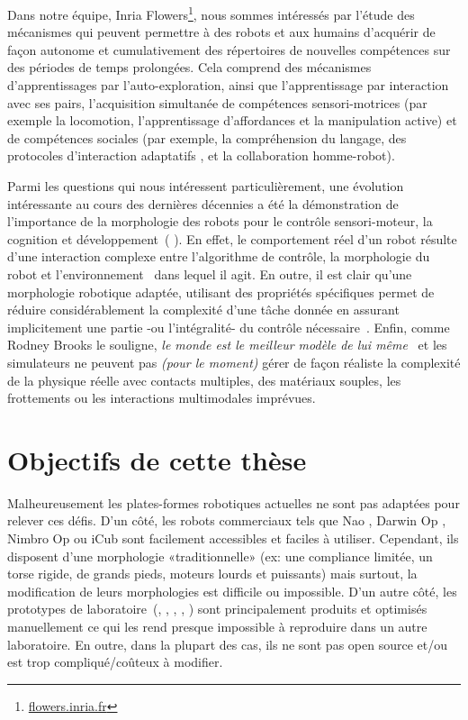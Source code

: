 Dans notre équipe, Inria Flowers\footnote{\url{flowers.inria.fr}}, nous sommes intéressés par l'étude des mécanismes qui peuvent permettre à des robots et aux humains d'acquérir de façon autonome et cumulativement des répertoires de nouvelles compétences sur des périodes de temps prolongées. Cela comprend des mécanismes d'apprentissages par l'auto-exploration, ainsi que l'apprentissage par interaction avec ses pairs, l'acquisition simultanée de compétences sensori-motrices (par exemple la locomotion, l'apprentissage d'affordances et la manipulation active) et de compétences sociales (par exemple, la compréhension du langage, des protocoles d'interaction adaptatifs , et la collaboration homme-robot).

Parmi les questions qui nous intéressent particulièrement, une évolution intéressante au cours des dernières décennies a été la démonstration de l'importance de la morphologie des robots pour le contrôle sensori-moteur, la cognition et développement~(\cite{kaplan2008corps} \cite{steels1995artificial} \cite{Pfeifer06}). En effet, le comportement réel d'un robot résulte d'une interaction complexe entre l'algorithme de contrôle, la morphologie du robot et l'environnement~\parencite{Steels1991emergence} dans lequel il agit. En outre, il est clair qu’une morphologie  robotique adaptée, utilisant des propriétés spécifiques permet de réduire considérablement la complexité d'une tâche donnée en assurant implicitement une partie -ou l’intégralité- du contrôle nécessaire~\parencite{pfeifer2005morphological}.
Enfin, comme Rodney Brooks le souligne, \emph{le monde est le meilleur modèle de lui même}~\parencite{brooks1991intelligence} et les simulateurs ne peuvent pas \emph{(pour le moment)} gérer de façon réaliste la complexité de la physique réelle avec contacts multiples, des matériaux souples, les frottements ou les interactions multimodales imprévues.


\section*{Objectifs de cette thèse} %

Malheureusement les plates-formes robotiques actuelles ne sont pas adaptées pour relever ces défis. D'un côté, les robots commerciaux tels que Nao \parencite{gouaillier2008nao}, Darwin Op \parencite{ha2011development}, Nimbro Op \parencite{schwarznimbro} ou iCub \parencite{metta2008icub} sont facilement accessibles et faciles à utiliser. Cependant, ils disposent d’une morphologie «traditionnelle» (ex: une compliance limitée, un torse rigide, de grands pieds, moteurs lourds et puissants) mais surtout, la modification de leurs morphologies est difficile ou impossible.
D’un autre côté, les prototypes de laboratoire~(\cite{wisse2007passive}, \cite{nakanishi2013design}, \cite{ly2011bio}, \cite{niiyama2010athlete}, \cite{radkhah2011concept}) sont principalement produits et optimisés manuellement ce qui les rend presque impossible à reproduire dans un autre laboratoire. En outre, dans la plupart des cas, ils ne sont pas open source et/ou est trop compliqué/coûteux à modifier.

